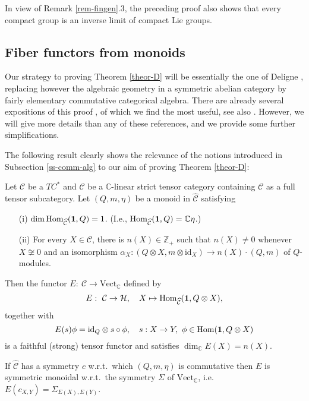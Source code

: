 \documentclass[11pt]{article}
\theoremstyle{definition}
\theoremstyle{definition}
\theoremstyle{remark}
\newcommand{\Vect}{\mathrm{Vect}}
\def\2#1{{\mathcal #1}}
\def\7#1{{\mathbb #1}}
\def\1#1{{\bf #1}}
\newcommand{\Hom}{\mathrm{Hom}}
\newcommand{\mcirc}{\circ}
\newcommand{\rarr}{\rightarrow}
\def\id{\mathrm{id}}
\begin{document}
\brem In view of Remark \ref{rem-fingen}.3, the preceding proof also
shows that every compact group is an inverse limit of compact Lie
groups.  \erem





\subsection{Fiber functors from monoids} \label{ss-monoid1}
 Our strategy to proving Theorem \ref{theor-D} will be
essentially the one of Deligne \cite{del}, replacing however the
algebraic geometry in a symmetric abelian category by fairly
elementary commutative categorical algebra. There are already several
expositions of this proof \cite{bichon,rosenb,phh}, of which we find
\cite{bichon} the most useful, see also \cite{bichon1}. However, we
will give more details than any of these references, and we provide
some further simplifications.

The following result clearly shows the relevance of the notions introduced in Subsection
\ref{ss-comm-alg} to our aim of proving Theorem \ref{theor-D}:

\bprop \label{prop-embed}  
Let $\2C$ be a $TC^*$ and $\widehat{\2C}$ be a $\7C$-linear strict tensor category containing $\2C$
as a full tensor subcategory. Let $(Q,m,\eta)$ be a monoid in $\widehat{\2C}$ satisfying
\begin{itemize}
\item[(i)] $\dim\Hom_{\widehat{\2C}}(\11,Q)=1$. (I.e., $\Hom_{\widehat{\2C}}(\11,Q)=\7C\eta$.)
\item[(ii)] For every $X\in\2C$, there is $n(X)\in\7Z_+$ such that $n(X)\ne 0$ whenever 
$X\not\cong 0$ and an isomorphism $\alpha_X:(Q\otimes X,m\otimes\id_X)\rarr n(X)\cdot(Q,m)$ of
$Q$-modules. 
\end{itemize}
Then the functor $E: \ \2C\rarr \Vect_\7C$ defined by 
\[ E: \ \2C\rarr\2H, \quad X\mapsto \Hom_{\widehat{\2C}}(\11,Q\otimes
X), \] together with
\begin{equation} \label{e-Emor}
E(s)\phi=\id_Q\otimes s\mcirc  \phi, \quad s:X\rarr Y,\ \phi\in\Hom(\11,Q\otimes X) 
\end{equation}
is a faithful (strong) tensor functor and satisfies $\dim_\7C E(X)=n(X)$.

If $\widehat{\2C}$ has a symmetry $c$ w.r.t.\ which $(Q,m,\eta)$ is
commutative then $E$ is symmetric monoidal w.r.t.\ the symmetry
$\Sigma$ of $\Vect_\7C$, i.e.\ $E(c_{X,Y})=\Sigma_{E(X),E(Y)}$.
\eprop
\end{document}
